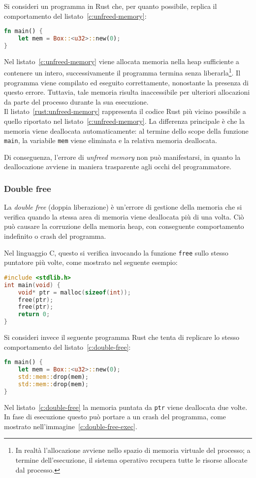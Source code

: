 \noindent Si consideri un programma in Rust che, per quanto possibile, replica il comportamento del listato~\ref{c:unfreed-memory}:
\begin{lstlisting}[language=Rust, caption={Unfreed memory in Rust}, label={rust:unfreed-memory}]
fn main() {
    let mem = Box::<u32>::new(0);
}
\end{lstlisting}
Nel listato~\ref{c:unfreed-memory} viene allocata memoria nella heap sufficiente a contenere un intero, successivamente 
il programma termina senza liberarla\footnote{In realtà l'allocazione avviene nello spazio di memoria virtuale del processo; a termine dell'esecuzione, il sistema operativo recupera tutte le risorse allocate dal processo.}. 
Il programma viene compilato ed eseguito correttamente, 
nonostante la presenza di questo errore. 
Tuttavia, tale memoria risulta inaccessibile per ulteriori allocazioni da parte del processo durante la sua esecuzione.\hfill
\vspace{10pt}\\
\noindent Il listato~\ref{rust:unfreed-memory} rappresenta il codice Rust più vicino possibile a 
quello riportato nel listato~\ref{c:unfreed-memory}. La differenza principale è che la memoria viene deallocata automaticamente: 
al termine dello scope della funzione \texttt{main}, la variabile \texttt{mem} viene eliminata e la relativa 
memoria deallocata. 

Di conseguenza, l'errore di \textit{unfreed memory} non può manifestarsi, in quanto la deallocazione avviene in maniera 
trasparente agli occhi del programmatore. 


\subsubsection{Double free}
La \textit{double free} (doppia liberazione) è un'errore di gestione della memoria che si verifica quando la stessa area di memoria viene deallocata
più di una volta. Ciò può causare la corruzione della memoria heap, con conseguente comportamento indefinito o crash del programma.

Nel linguaggio C, questo si verifica invocando la funzione \texttt{free} sullo stesso puntatore più volte, come mostrato 
nel seguente esempio:
\begin{samepage}
\begin{lstlisting}[language=C, caption={Double free in C}, label={c:double-free}]
#include <stdlib.h>
int main(void) {
    void* ptr = malloc(sizeof(int));
    free(ptr);
    free(ptr);
    return 0;
}
\end{lstlisting}
\end{samepage}
Si consideri invece il seguente programma Rust che tenta di replicare lo stesso comportamento del listato~\ref{c:double-free}:
\begin{lstlisting}[language=Rust, caption={Double free in Rust}, label={rust:double-free}]
fn main() {
    let mem = Box::<u32>::new(0);
    std::mem::drop(mem);
    std::mem::drop(mem);
}
\end{lstlisting}
Nel listato~\ref{c:double-free} la memoria puntata da \texttt{ptr} viene deallocata due volte.
In fase di esecuzione questo può portare a un crash del programma, come mostrato nell'immagine~\ref{c:double-free-exec}.

